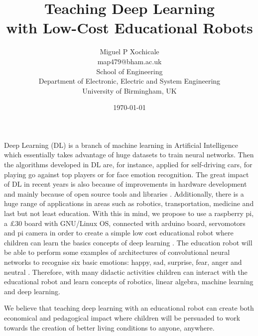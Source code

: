 \documentclass[11pt]{article}
\author{Miguel P Xochicale\\
map479@bham.ac.uk\\
School of Engineering\\
Department of Electronic, Electric and System Engineering\\
University of Birmingham, UK}
\title{Teaching Deep Learning  \\ with Low-Cost Educational Robots} %
\date{\today}
\begin{document}
\maketitle



Deep Learning (DL) is a branch of machine learning in Artificial Intelligence
which essentially takes advantage of huge datasets to train neural networks.
Then the algorithms developed in DL are, for instance, applied for self-driving cars,
for playing go against top players or for face emotion recognition. The great
impact of DL in recent years is also because of improvements in hardware development and
mainly because of open source tools and libraries \cite{matelabs2017}.
Additionally, there is a huge range of applications in areas such as robotics,
transportation, medicine and last but not least education.
With this in mind, we propose to use a raspberry pi, a $\pounds$30 board with
GNU/Linux OS, connected with arduino board, servomotors and pi camera in order
to create a simple low cost educational robot where children can learn the basics
concepts of deep learning  \cite{durr2015}.
The education robot will be able to perform some examples of architectures of
convolutional neural networks to recognise six basic emotions:
happy, sad, surprise, fear, anger and neutral \cite{ho2016, Ruiz-Garcia2016}.
Therefore, with many didactic activities children can interact with the educational
robot and learn concepts of robotics, linear algebra, machine learning and deep learning.

We believe that teaching deep learning with an educational robot can create
both economical and pedagogical impact where children will be persuaded to work
towards the creation of better living conditions to anyone, anywhere.




% 
\end{document}
